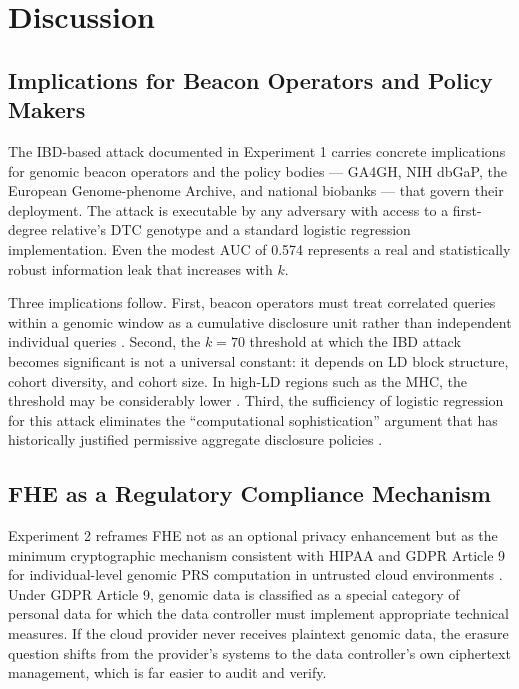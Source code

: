 \documentclass[conference]{IEEEtran}
\begin{document}
\section{Discussion}

\subsection{Implications for Beacon Operators and Policy Makers}

The IBD-based attack documented in Experiment 1 carries concrete implications
for genomic beacon operators and the policy bodies --- GA4GH, NIH dbGaP, the
European Genome-phenome Archive, and national biobanks --- that govern their
deployment. The attack is executable by any adversary with access to a
first-degree relative's DTC genotype and a standard logistic regression
implementation. Even the modest AUC of 0.574 represents a real and
statistically robust information leak that increases with $k$.

Three implications follow. First, beacon operators must treat correlated queries
within a genomic window as a cumulative disclosure unit rather than independent
individual queries \cite{raisaro2017,vonthenen2019}. Second, the $k=70$
threshold at which the IBD attack becomes significant is not a universal
constant: it depends on LD block structure, cohort diversity, and cohort size.
In high-LD regions such as the MHC, the threshold may be considerably lower
\cite{gursoy2022functional}. Third, the sufficiency of logistic regression for
this attack eliminates the ``computational sophistication'' argument that has
historically justified permissive aggregate disclosure policies \cite{homer2008}.

\subsection{FHE as a Regulatory Compliance Mechanism}

Experiment 2 reframes FHE not as an optional privacy enhancement but as the
minimum cryptographic mechanism consistent with HIPAA and GDPR Article 9 for
individual-level genomic PRS computation in untrusted cloud environments
\cite{gentry2009,cho2024}. Under GDPR Article 9, genomic data is classified
as a special category of personal data for which the data controller must
implement appropriate technical measures. If the cloud provider never receives
plaintext genomic data, the erasure question shifts from the provider's systems
to the data controller's own ciphertext management, which is far easier to
audit and verify.
\end{document}
